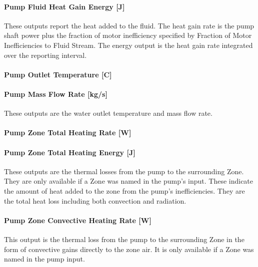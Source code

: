 \paragraph{Pump Fluid Heat Gain Energy {[}J{]}}\label{pump-fluid-heat-gain-energy-j}

These outputs report the heat added to the fluid. The heat gain rate is the pump shaft power plus the fraction of motor inefficiency specified by Fraction of Motor Inefficiencies to Fluid Stream. The energy output is the heat gain rate integrated over the reporting interval.

\paragraph{Pump Outlet Temperature {[}C{]}}\label{pump-outlet-temperature-c}

\paragraph{Pump Mass Flow Rate {[}kg/s{]}}\label{pump-mass-flow-rate-kgs}

These outputs are the water outlet temperature and mass flow rate.

\paragraph{Pump Zone Total Heating Rate {[}W{]}}\label{pump-zone-total-heating-rate-w}

\paragraph{Pump Zone Total Heating Energy {[}J{]}}\label{pump-zone-total-heating-energy-j}

These outputs are the thermal losses from the pump to the surrounding Zone. They are only available if a Zone was named in the pump's input. These indicate the amount of heat added to the zone from the pump's inefficiencies. They are the total heat loss including both convection and radiation.

\paragraph{Pump Zone Convective Heating Rate {[}W{]}}\label{pump-zone-convective-heating-rate-w}

This output is the thermal loss from the pump to the surrounding Zone in the form of convective gains directly to the zone air. It is only available if a Zone was named in the pump input.

